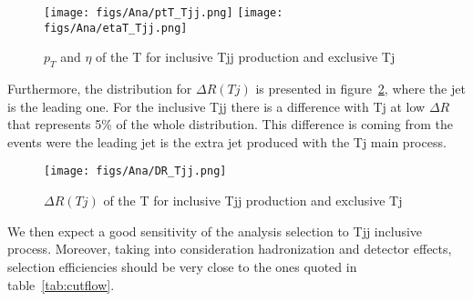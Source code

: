 \begin{figure}[!hbtp]
  \begin{center}
    \texttt{[image: figs/Ana/ptT\_Tjj.png]}
    \texttt{[image: figs/Ana/etaT\_Tjj.png]}
    \caption{$p_{T}$ and $\eta$ of the T for inclusive Tjj production and exclusive Tj}
    \label{fig:T_Tjj}
  \end{center}
\end{figure}

Furthermore, the distribution for $\Delta R (Tj)$ is presented in figure~\ref{fig:DR_Tjj}, where the jet is the leading one. For the inclusive Tjj there is a difference with Tj at low $\Delta R$ that represents 5\% of the whole distribution. This difference is coming from the events were the leading jet is the extra jet produced with the Tj main process.

\begin{figure}[!hbtp]
  \begin{center}
    \texttt{[image: figs/Ana/DR\_Tjj.png]}
    \caption{$\Delta R (Tj)$ of the T for inclusive Tjj production and exclusive Tj}
    \label{fig:DR_Tjj}
  \end{center}
\end{figure}

We then expect a good sensitivity of the analysis selection to Tjj inclusive process. Moreover, taking into consideration hadronization and detector effects, selection efficiencies should be very close to the ones quoted in table~\ref{tab:cutflow}.